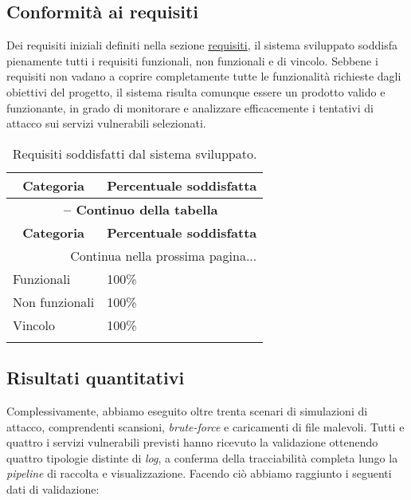 \subsection*{Conformità ai requisiti}
Dei requisiti iniziali definiti nella sezione \hyperref[requisiti]{requisiti}, il sistema sviluppato soddisfa pienamente tutti i requisiti funzionali, non funzionali e di vincolo.
Sebbene i requisiti non vadano a coprire completamente tutte le funzionalità richieste dagli obiettivi del progetto, il sistema risulta comunque essere un prodotto valido e funzionante, in grado di monitorare e analizzare efficacemente i tentativi di attacco sui servizi vulnerabili selezionati.
\begin{center}
\begin{longtable}{|p{}|p{}|}
\hline
\multicolumn{1}{|c|}{\textbf{Categoria}} & \multicolumn{1}{c|}{\textbf{Percentuale soddisfatta}}\\ 
\hline 
\endfirsthead
\multicolumn{2}{c}{{\bfseries \tablename\ \thetable{} -- Continuo della tabella}}\\
\hline
\multicolumn{1}{|c|}{\textbf{Categoria}} & \multicolumn{1}{c|}{\textbf{Percentuale soddisfatta}}\\ \hline 
\endhead
\hline
\multicolumn{2}{|r|}{{Continua nella prossima pagina...}}\\
\hline
\endfoot
\endlastfoot 

Funzionali & 100\%\\ \hline
Non funzionali & 100\%\\ \hline
Vincolo & 100\%\\ \hline
\caption{Requisiti soddisfatti dal sistema sviluppato.}
\label{tab:requisiti-soddisfatti}
\end{longtable}
\end{center}

\subsection*{Risultati quantitativi}
Complessivamente, abbiamo eseguito oltre trenta scenari di simulazioni di attacco, comprendenti scansioni, \textit{brute-force} e caricamenti di file malevoli. Tutti e quattro i servizi vulnerabili previsti hanno ricevuto la validazione ottenendo quattro tipologie distinte di \textit{log}, a conferma della tracciabilità completa lungo la \textit{pipeline} di raccolta e visualizzazione.
Facendo ciò abbiamo raggiunto i seguenti dati di validazione:

